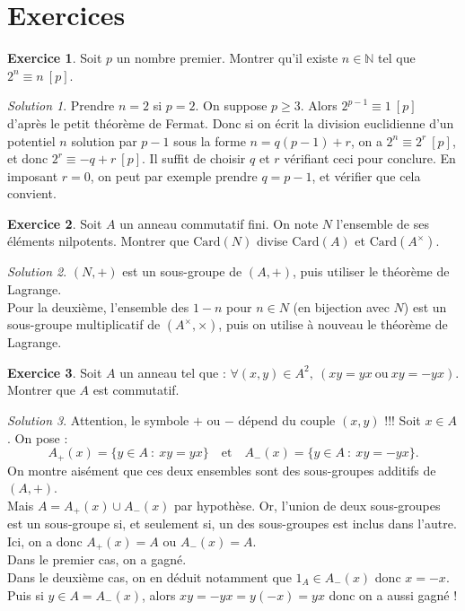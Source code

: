 \documentclass[french]{book}
\newcommand{\N}{\mathbb{N}}
\newcommand{\card}{\text{Card}}
\theoremstyle{definition}
\newtheorem{ex}{Exercice}[chapter]
\theoremstyle{remark}
\newtheorem*{sol}{Solution}
\begin{document}
\section{Exercices}

\begin{ex}
	Soit $p$ un nombre premier. Montrer qu'il existe $n\in\N$ tel que $2^n\equiv n\ [p]$.
\end{ex}
\begin{sol}
	Prendre $n=2$ si $p=2$. On suppose $p\geqslant 3$. Alors $2^{p-1}\equiv 1\ [p]$ d'après le petit théorème de Fermat. Donc si on écrit la division euclidienne d'un potentiel $n$ solution par $p-1$ sous la forme $n=q(p-1)+r$, on a $2^n\equiv 2^r\ [p]$, et donc $2^r\equiv -q+r\ [p]$. Il suffit de choisir $q$ et $r$ vérifiant ceci pour conclure. En imposant $r=0$, on peut par exemple prendre $q=p-1$, et vérifier que cela convient.
\end{sol}

\begin{ex}
	Soit $A$ un anneau commutatif fini. On note $N$ l'ensemble de ses éléments nilpotents. Montrer que $\card(N)$ divise $\card(A)$ et $\card(A^\times)$.
\end{ex}
\begin{sol}
	$(N,+)$ est un sous-groupe de $(A,+)$, puis utiliser le théorème de Lagrange. \\
	Pour la deuxième, l'ensemble des $1-n$ pour $n\in N$ (en bijection avec $N$) est un sous-groupe multiplicatif de $(A^\times,\times)$, puis on utilise à nouveau le théorème de Lagrange.
\end{sol}

\begin{ex}
	Soit $A$ un anneau tel que : $\forall (x,y)\in A^2,\ (xy=yx\ \text{ou}\ xy=-yx)$. Montrer que $A$ est commutatif.
\end{ex}
\begin{sol}
	Attention, le symbole $+$ ou $-$ dépend du couple $(x,y)$ !!! Soit $x\in A$. On pose :
	$$A_+(x)=\{y\in A\ :\ xy=yx\}\quad\text{et}\quad A_-(x)=\{y\in A\ :\ xy=-yx\}.$$
	On montre aisément que ces deux ensembles sont des sous-groupes additifs de $(A,+)$.\\
	Mais $A=A_+(x)\cup A_-(x)$ par hypothèse. Or, l'union de deux sous-groupes est un sous-groupe si, et seulement si, un des sous-groupes est inclus dans l'autre. Ici, on a donc $A_+(x)=A$ ou $A_-(x)=A$.\\
	Dans le premier cas, on a gagné.\\
	Dans le deuxième cas, on en déduit notamment que $1_A\in A_-(x)$ donc $x=-x$. Puis si $y\in A=A_-(x)$, alors $xy=-yx=y(-x)=yx$ donc on a aussi gagné !
\end{sol}
\end{document}
